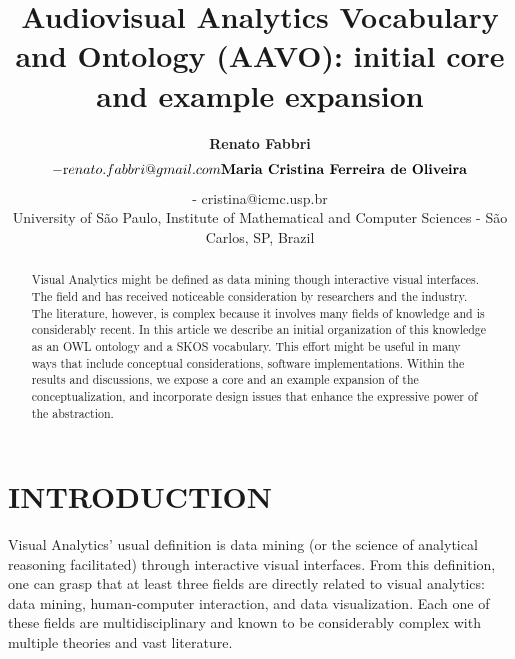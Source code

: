 \documentclass[12pt,fleqn]{article}
\title{Audiovisual Analytics Vocabulary and Ontology (AAVO): initial core and example expansion}
\author
    {\rm \begin{tabular}{l} 
    \textbf{Renato Fabbri}$$ - {\textnormal renato.fabbri@gmail.com}\\%
    \textbf{Maria Cristina Ferreira de Oliveira}$$ - {\textnormal cristina@icmc.usp.br}\\
    {\fontsize{11}{0}\selectfont University of São Paulo, Institute of Mathematical and Computer Sciences - São Carlos, SP, Brazil}\vspace*{-0.05cm} \\
  \end{tabular}}
\renewcommand{\headrulewidth}{0.0pt}
\begin{document}
\maketitle

\thispagestyle{firspagetstyle}

\renewcommand{\headrulewidth}{0.0pt}
\rhead{}

\begin{abstract}
Visual Analytics might be defined as data mining though interactive visual interfaces.
The field and has received noticeable consideration by researchers and the industry. 
The literature, however, is complex because it involves many fields of knowledge
and is considerably recent.
In this article we describe an initial organization of this knowledge as an OWL ontology
and a SKOS vocabulary.
This effort might be useful in many ways that include conceptual considerations,
software implementations.
Within the results and discussions, we expose a core and an example expansion
of the conceptualization, and incorporate design issues that enhance the
expressive power of the abstraction. 
\end{abstract}


\pagestyle{fancy}

\section{INTRODUCTION}\label{sec:intro}
Visual Analytics' usual definition is data mining (or the science of analytical reasoning facilitated)
through interactive visual interfaces.
From this definition, one can grasp that at least three fields are directly related to visual analytics:
data mining, human-computer interaction, and data visualization.
Each one of these fields are multidisciplinary and known to be considerably complex
with multiple theories and vast literature.
\end{document}

